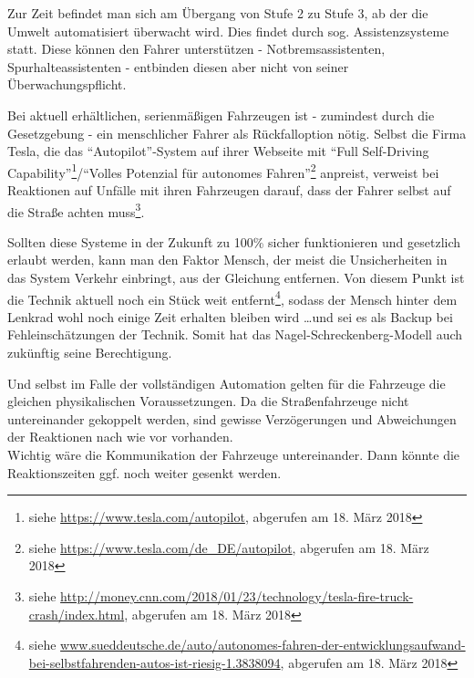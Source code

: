 Zur Zeit befindet man sich am Übergang von Stufe 2 zu Stufe 3, ab der die Umwelt automatisiert überwacht wird.
Dies findet durch sog. Assistenzsysteme statt.
Diese können den Fahrer unterstützen - Notbremsassistenten, Spurhalteassistenten - entbinden diesen aber nicht von seiner Überwachungspflicht.

Bei aktuell erhältlichen, serienmäßigen Fahrzeugen ist - zumindest durch die Gesetzgebung - ein menschlicher Fahrer als Rückfalloption nötig.
Selbst die Firma Tesla, die das \enquote{Autopilot}-System auf ihrer Webseite mit \enquote{Full Self-Driving Capability}\footnote{siehe \url{https://www.tesla.com/autopilot}, abgerufen am 18. März 2018}/\enquote{Volles Potenzial für autonomes Fahren}\footnote{siehe \url{https://www.tesla.com/de_DE/autopilot}, abgerufen am 18. März 2018} anpreist, verweist bei Reaktionen auf Unfälle mit ihren Fahrzeugen darauf, dass der Fahrer selbst auf die Straße achten muss\footnote{siehe \url{http://money.cnn.com/2018/01/23/technology/tesla-fire-truck-crash/index.html}, abgerufen am 18. März 2018}.

Sollten diese Systeme in der Zukunft zu 100\% sicher funktionieren und gesetzlich erlaubt werden, kann man den Faktor Mensch, der meist die Unsicherheiten in das System Verkehr einbringt, aus der Gleichung entfernen.
Von diesem Punkt ist die Technik aktuell noch ein Stück weit entfernt\footnote{siehe \url{www.sueddeutsche.de/auto/autonomes-fahren-der-entwicklungsaufwand-bei-selbstfahrenden-autos-ist-riesig-1.3838094}, abgerufen am 18. März 2018}, sodass der Mensch hinter dem Lenkrad wohl noch einige Zeit erhalten bleiben wird \ldots und sei es als Backup bei Fehleinschätzungen der Technik.
Somit hat das Nagel-Schreckenberg-Modell auch zukünftig seine Berechtigung.

Und selbst im Falle der vollständigen Automation gelten für die Fahrzeuge die gleichen physikalischen Voraussetzungen.
Da die Straßenfahrzeuge nicht untereinander gekoppelt werden, sind gewisse Verzögerungen und Abweichungen der Reaktionen nach wie vor vorhanden.
\\
Wichtig wäre die Kommunikation der Fahrzeuge untereinander.
Dann könnte die Reaktionszeiten ggf. noch weiter gesenkt werden.
